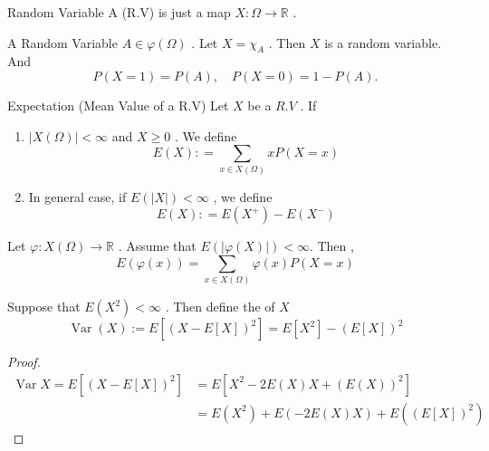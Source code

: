 \documentclass[../main.tex]{subfiles}
\begin{document}
\begin{definition}{Random Variable}{}
    A  (R.V) is  just a  map \(  X: \Omega \to \mathbb{R}   \) .  
\end{definition}

\begin{example}{A Random Variable}{}
    \(  A \in  \varphi \left(  \Omega  \right)   \) . Let \(  X =  \chi _{A}  \) . Then \(  X  \) is a random variable. And \[
    P\left( X= 1 \right)= P\left( A \right),\quad P\left( X= 0 \right)= 1-P\left( A \right).     
    \]
\end{example}

\begin{definition}{Expectation (Mean Value of a R.V)}{}
    Let \(  X  \) be a \(  R. V  \) . If 
    \begin{enumerate}
        \item \(  \left| X\left(  \Omega  \right)  \right|< \infty   \)  and \(  X\ge 0  \) .  We define  \[
        E\left( X \right): = \sum _{x \in X\left(  \Omega  \right) }x P\left( X= x \right)   
        \]
        \item In general case, if \(  E\left( \left| X \right|  \right)< \infty   \) , we define \[
        E\left( X \right): = E\left( X^{+ }\right)-E\left( X^{-}\right)   
        \] 
    \end{enumerate}
      
\end{definition}

\begin{proposition}{}{}
    Let \(   \varphi : X\left(  \Omega  \right)\to \mathbb{R}    \) . Assume that \(  E\left( \left|  \varphi \left( X \right) \right|  \right)< \infty   \). Then , \[
    E\left(  \varphi \left( x \right)  \right) =  \sum _{x \in X\left(  \Omega  \right) } \varphi \left( x \right)P\left( X= x \right)  
    \] 
\end{proposition}

\begin{definition}{}{}
    Suppose that \(  E\left( X^{2} \right)< \infty   \) . Then define the  of \(  X  \)  \[
 \operatorname{Var}\left( X \right)  := E\left[ (X - E[X])^2 \right]= E\left[ X^{2} \right]-\left( E\left[ X \right]  \right)^{2}  
    \]  
\end{definition}
\begin{proof}
    \[
    \begin{aligned}
    \operatorname{Var}X= E\left[ \left( X-E\left[ X \right]  \right)^{2}  \right]&=  E\left[ X^{2}- 2E\left( X \right)X+ \left( E\left( X \right)  \right)^{2}   \right]\\ 
     &=  E\left( X^{2} \right)+ E\left( -2E\left( X \right)X  \right)+ E\left( \left( E\left[ X \right]  \right)^{2}  \right)     
    \end{aligned}
    \]
\end{proof}
\end{document}

